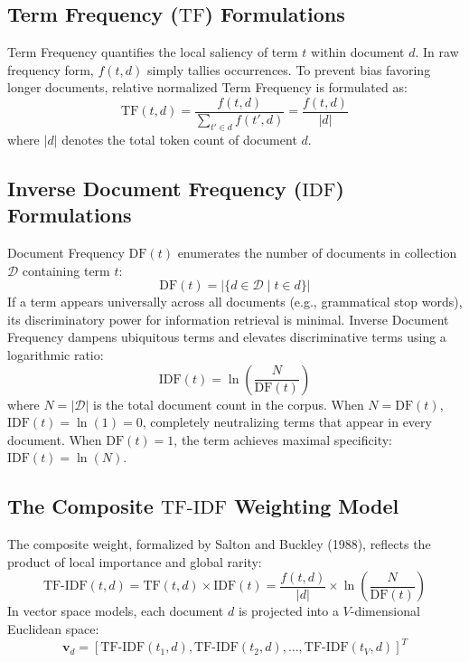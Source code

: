 \documentclass[12pt,a4paper]{report}
\begin{document}
\subsection{Term Frequency ($\text{TF}$) Formulations}
Term Frequency quantifies the local saliency of term $t$ within document $d$. In raw frequency form, $f(t, d)$ simply tallies occurrences. To prevent bias favoring longer documents, relative normalized Term Frequency is formulated as:
\begin{equation}
    \text{TF}(t, d) = \frac{f(t, d)}{\sum_{t' \in d} f(t', d)} = \frac{f(t, d)}{|d|}
\end{equation}
where $|d|$ denotes the total token count of document $d$.

\subsection{Inverse Document Frequency ($\text{IDF}$) Formulations}
Document Frequency $\text{DF}(t)$ enumerates the number of documents in collection $\mathcal{D}$ containing term $t$:
\begin{equation}
    \text{DF}(t) = |\{d \in \mathcal{D} \mid t \in d\}|
\end{equation}
If a term appears universally across all documents (e.g., grammatical stop words), its discriminatory power for information retrieval is minimal. Inverse Document Frequency dampens ubiquitous terms and elevates discriminative terms using a logarithmic ratio:
\begin{equation}
    \text{IDF}(t) = \ln\left(\frac{N}{\text{DF}(t)}\right)
\end{equation}
where $N = |\mathcal{D}|$ is the total document count in the corpus. When $N = \text{DF}(t)$, $\text{IDF}(t) = \ln(1) = 0$, completely neutralizing terms that appear in every document. When $\text{DF}(t) = 1$, the term achieves maximal specificity: $\text{IDF}(t) = \ln(N)$.

\subsection{The Composite $\text{TF-IDF}$ Weighting Model}
The composite weight, formalized by Salton and Buckley (1988), reflects the product of local importance and global rarity:
\begin{equation}
    \text{TF-IDF}(t, d) = \text{TF}(t, d) \times \text{IDF}(t) = \frac{f(t, d)}{|d|} \times \ln\left(\frac{N}{\text{DF}(t)}\right)
\end{equation}
In vector space models, each document $d$ is projected into a $V$-dimensional Euclidean space:
\begin{equation}
    \mathbf{v}_d = [\text{TF-IDF}(t_1, d), \text{TF-IDF}(t_2, d), \dots, \text{TF-IDF}(t_V, d)]^T
\end{equation}
\end{document}
